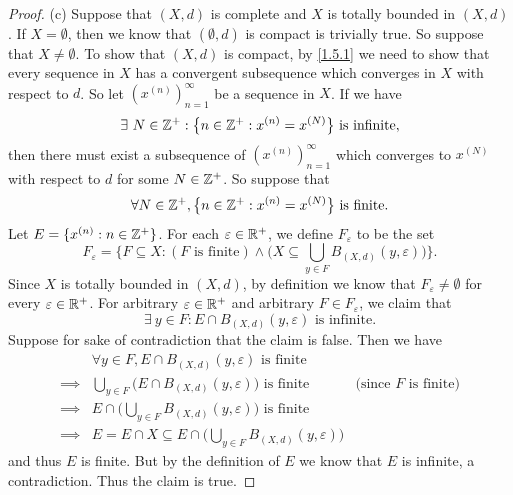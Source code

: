 \begin{proof}{(c)}
  Suppose that \((X, d)\) is complete and \(X\) is totally bounded in \((X, d)\).
  If \(X = \emptyset\), then we know that \((\emptyset, d)\) is compact is trivially true.
  So suppose that \(X \neq \emptyset\).
  To show that \((X, d)\) is compact, by \cref{1.5.1} we need to show that every sequence in \(X\) has a convergent subsequence which converges in \(X\) with respect to \(d\).
  So let \((x^{(n)})_{n = 1}^\infty\) be a sequence in \(X\).
  If we have
  \[
    \exists\ N \in \mathbb{Z}^+ : \big\{n \in \mathbb{Z}^+ : x^{(n)} = x^{(N)}\big\} \text{ is infinite},
  \]
  then there must exist a subsequence of \((x^{(n)})_{n = 1}^\infty\) which converges to \(x^{(N)}\) with respect to \(d\) for some \(N \in \mathbb{Z}^+\).
  So suppose that
  \[
    \forall N \in \mathbb{Z}^+, \big\{n \in \mathbb{Z}^+ : x^{(n)} = x^{(N)}\big\} \text{ is finite}.
  \]
  Let \(E = \{x^{(n)} : n \in \mathbb{Z}^+\}\).
  For each \(\varepsilon \in \mathbb{R}^+\), we define \(F_\varepsilon\) to be the set
  \[
    F_\varepsilon = \Bigg\{F \subseteq X : (F \text{ is finite}) \land \bigg(X \subseteq \bigcup_{y \in F} B_{(X, d)}(y, \varepsilon)\bigg)\Bigg\}.
  \]
  Since \(X\) is totally bounded in \((X, d)\), by definition we know that \(F_\varepsilon \neq \emptyset\) for every \(\varepsilon \in \mathbb{R}^+\).
  For arbitrary \(\varepsilon \in \mathbb{R}^+\) and arbitrary \(F \in F_\varepsilon\), we claim that
  \[
    \exists\ y \in F : E \cap B_{(X, d)}(y, \varepsilon) \text{ is infinite}.
  \]
  Suppose for sake of contradiction that the claim is false.
  Then we have
  \begin{align*}
             & \forall y \in F, E \cap B_{(X, d)}(y, \varepsilon) \text{ is finite}                                                    \\
    \implies & \bigcup_{y \in F} \bigg(E \cap B_{(X, d)}(y, \varepsilon)\bigg) \text{ is finite}      & \text{(since \(F\) is finite)} \\
    \implies & E \cap \bigg(\bigcup_{y \in F} B_{(X, d)}(y, \varepsilon)\bigg) \text{ is finite}                                       \\
    \implies & E = E \cap X \subseteq E \cap \bigg(\bigcup_{y \in F} B_{(X, d)}(y, \varepsilon)\bigg)
  \end{align*}
  and thus \(E\) is finite.
  But by the definition of \(E\) we know that \(E\) is infinite, a contradiction.
  Thus the claim is true.


\end{proof}
